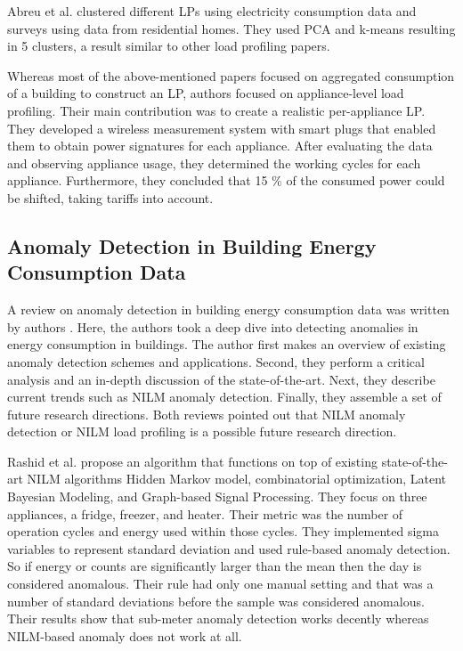 Abreu et al.\cite{Joana2012} clustered different LPs using electricity consumption data and surveys using data from residential homes.
They used PCA and k-means resulting in 5 clusters, a result similar to other load profiling papers. 

Whereas most of the above-mentioned papers focused on aggregated consumption of a building to construct an LP,
authors \cite{Issi2018} focused on appliance-level load profiling.
Their main contribution was to create a realistic per-appliance LP.
They developed a wireless measurement system with smart plugs that enabled them to obtain power signatures for each appliance. 
After evaluating the data and observing appliance usage, they determined the working cycles for each appliance.
Furthermore, they concluded that 15 \% of the consumed power could be shifted, taking tariffs into account.

\subsection{Anomaly Detection in Building Energy Consumption Data}

A review on anomaly detection in building energy consumption data was written by authors \cite{HIMEUR2021116601}.
Here, the authors took a deep dive into detecting anomalies in energy consumption in buildings. 
The author first makes an overview of existing anomaly detection schemes and applications.
Second, they perform a critical analysis and an in-depth discussion of the state-of-the-art.
Next, they describe current trends such as NILM anomaly detection. Finally, they assemble a set of future research directions. 
Both reviews pointed out that NILM anomaly detection or NILM load profiling is a possible future research direction.

Rashid et al.\cite{NILMAD2019} propose an algorithm
that functions on top of existing state-of-the-art NILM algorithms Hidden Markov model,
combinatorial optimization, Latent Bayesian Modeling, and Graph-based Signal Processing.
They focus on three appliances, a fridge, freezer, and heater. Their metric was the number of operation cycles and energy used within those cycles. 
They implemented sigma variables to represent standard deviation and used rule-based anomaly detection.
So if energy or counts are significantly larger than the mean then the day is considered anomalous.
Their rule had only one manual setting and that was a number of standard deviations before the sample was considered anomalous.
Their results show that sub-meter anomaly detection works decently whereas NILM-based anomaly does not work at all. 

